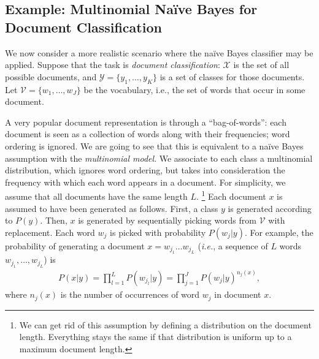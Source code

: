 \subsection{Example: Multinomial Na\"{i}ve Bayes for Document Classification}

We now consider a more realistic scenario where the na\"ive Bayes classifier may be applied. 
Suppose that the task is \emph{document classification}: 
$\mathcal{X}$ is the set of all possible documents, and $\mathcal{Y}=\{y_1,\ldots,y_K\}$ is a set of classes for those documents. 
Let $\mathcal{V} = \{w_1,\ldots,w_J\}$ be the vocabulary, i.e., the set of words that occur in some document. 

A very popular document representation is through a ``bag-of-words'': each document is seen as a collection of words along with 
their frequencies; word ordering is ignored. We are going to see that this is equivalent to a na\"ive Bayes assumption with the \emph{multinomial model}. 
We associate to each class a multinomial distribution, which ignores word ordering, but takes into consideration the 
frequency with which each word appears in a document. For simplicity, we assume that all documents have the same length $L$.%
\footnote{We can get rid of this assumption by defining a distribution on the document length. Everything stays the same 
if that distribution is uniform up to a maximum document length.} %
Each document $x$ is assumed to have been generated as follows. First, a class $y$ is generated according to $P(y)$. Then, 
$x$ is generated by sequentially picking words from $\mathcal{V}$ with replacement. Each word $w_j$ is picked with probability $P(w_j|y)$. 
For example, the probability of generating a document $x = w_{j_1}\ldots w_{j_L}$ (\emph{i.e.}, a sequence of 
$L$ words $w_{j_1},\ldots,w_{j_L}$) is 
\begin{eqnarray}
P(x|y) = \prod_{l=1}^L P(w_{j_l}|y) = \prod_{j=1}^J P(w_j|y)^{n_j(x)},
\end{eqnarray}
where $n_j(x)$ is the number of occurrences of word $w_j$ in document $x$. 

